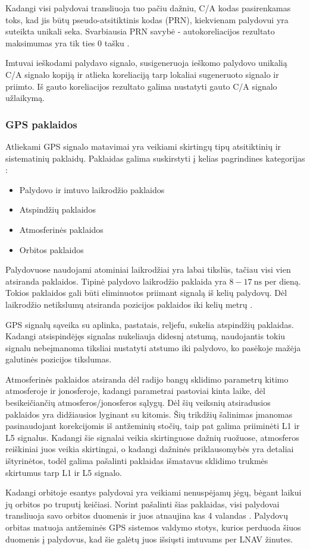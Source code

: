 \documentclass[main.tex]{subfiles}
\begin{document}
Kadangi visi palydovai transliuoja tuo pačiu dažniu, C/A kodas pasirenkamas toks,
kad jis būtų pseudo-atsitiktinis kodas (PRN), kiekvienam palydovui yra suteikta unikali seka.
Svarbiausia PRN savybė - autokoreliacijos rezultato maksimumas yra tik
ties 0 tašku \cite{OCHIN202121_chapter2}.

Imtuvai ieškodami palydavo signalo, susigeneruoja ieškomo palydovo unikalią C/A signalo
kopiją ir atlieka koreliaciją tarp lokaliai sugeneruoto signalo ir priimto.
Iš gauto koreliacijos rezultato galima nustatyti gauto C/A signalo užlaikymą.

\subsubsection {GPS paklaidos}

Atliekami GPS signalo matavimai yra veikiami skirtingų tipų atsitiktinių ir sistematinių
paklaidų. Paklaidas galima suskirstyti į kelias pagrindines kategorijas \cite{KUMAR20213_chapter1}:

\begin{itemize}
    \item Palydovo ir imtuvo laikrodžio paklaidos
    \item Atspindžių paklaidos
    \item Atmosferinės paklaidos
    \item Orbitos paklaidos
\end{itemize}

Palydovuose naudojami atominiai laikrodžiai yra labai tikslūs, tačiau visi vien atsiranda paklaidos.
Tipinė palydovo laikrodžio paklaida yra $8-17\ \mathrm{ns}$ per dieną. Tokios paklaidos
gali būti eliminuotos priimant signalą iš kelių palydovų. Dėl laikrodžio netikslumų atsiranda
pozicijos paklaidos iki kelių metrų \cite{KUMAR20213_chapter1}.

GPS signalų sąveika su aplinka, pastatais, reljefu, sukelia atspindžių paklaidas. Kadangi
atsispindėjęs signalas nukeliauja didesnį atstumą, naudojantis tokiu signalu nebeįmanoma
tiksliai nustatyti atstumo iki palydovo, ko pasėkoje mažėja galutinės pozicijos tikslumas.

Atmosferinės paklaidos atsiranda dėl radijo bangų sklidimo parametrų kitimo atmosferoje ir
jonosferoje, kadangi parametrai pastoviai kinta laike, dėl besikeičiančių atmosferos/jonosferos
sąlygų. Dėl šių veiksnių atsiradusios paklaidos yra didžiausios lyginant su kitomis.
Šių trikdžių šalinimas įmanomas pasinaudojant korekcijomis iš antžeminių stočių, taip
pat galima priiminėti L1 ir L5 signalus. Kadangi šie signalai veikia skirtinguose
dažnių ruožuose, atmosferos reiškiniai juos veikia skirtingai, o kadangi
dažninės priklausomybės yra detaliai ištyrinėtos, todėl galima pašalinti
paklaidas išmatavus sklidimo trukmės skirtumus tarp L1 ir L5 signalo.

Kadangi orbitoje esantys palydovai yra veikiami nenuspėjamų jėgų, bėgant laikui jų orbitos
po truputį keičiasi. Norint pašalinti šias paklaidas, visi palydovai transliuoja savo
orbitos duomenis ir juos atnaujina kas 4 valandas \cite{sps_standard}. Palydovų orbitas
matuoja antžeminės GPS sistemos valdymo stotys, kurios perduoda šiuos duomenis
į palydovus, kad šie galėtų juos išsiųsti imtuvams per LNAV žinutes.
\end{document}
